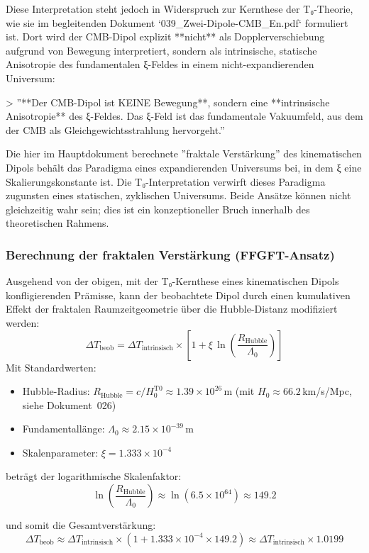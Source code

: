 Diese Interpretation steht jedoch in Widerspruch zur Kernthese der T₀-Theorie, wie sie im begleitenden Dokument `039\_Zwei-Dipole-CMB\_En.pdf` formuliert ist. Dort wird der CMB-Dipol explizit **nicht** als Dopplerverschiebung aufgrund von Bewegung interpretiert, sondern als intrinsische, statische Anisotropie des fundamentalen ξ-Feldes in einem nicht-expandierenden Universum:

> ''**Der CMB-Dipol ist KEINE Bewegung**, sondern eine **intrinsische Anisotropie** des ξ-Feldes. Das ξ-Feld ist das fundamentale Vakuumfeld, aus dem der CMB als Gleichgewichtsstrahlung hervorgeht.''

Die hier im Hauptdokument berechnete ''fraktale Verstärkung'' des kinematischen Dipols behält das Paradigma eines expandierenden Universums bei, in dem ξ eine Skalierungskonstante ist. Die T₀-Interpretation verwirft dieses Paradigma zugunsten eines statischen, zyklischen Universums. Beide Ansätze können nicht gleichzeitig wahr sein; dies ist ein konzeptioneller Bruch innerhalb des theoretischen Rahmens.

\subsubsection*{Berechnung der fraktalen Verstärkung (FFGFT-Ansatz)}

Ausgehend von der obigen, mit der T₀-Kernthese eines kinematischen Dipols konfligierenden Prämisse, kann der beobachtete Dipol durch einen kumulativen Effekt der fraktalen Raumzeitgeometrie über die Hubble-Distanz modifiziert werden:
\[
\Delta T_{\text{beob}} = \Delta T_{\text{intrinsisch}} \times \left[1 + \xi \, \ln\left(\frac{R_{\text{Hubble}}}{\Lambda_0}\right)\right]
\]
Mit Standardwerten:
\begin{itemize}
	\item Hubble-Radius: $R_{\text{Hubble}} = c/H_0^{\text{T0}} \approx 1.39 \times 10^{26} \, \text{m}$ (mit $H_0 \approx 66.2\,$km/s/Mpc, siehe Dokument~026)
	\item Fundamentallänge: $\Lambda_0 \approx 2.15 \times 10^{-39} \, \text{m}$
	\item Skalenparameter: $\xi = 1.333 \times 10^{-4}$
\end{itemize}

beträgt der logarithmische Skalenfaktor:
\[
\ln\left(\frac{R_{\text{Hubble}}}{\Lambda_0}\right) \approx \ln(6.5 \times 10^{64}) \approx 149.2
\]

und somit die Gesamtverstärkung:
\[
\Delta T_{\text{beob}} \approx \Delta T_{\text{intrinsisch}} \times (1 + 1.333\times10^{-4} \times 149.2) \approx \Delta T_{\text{intrinsisch}} \times 1.0199
\]

